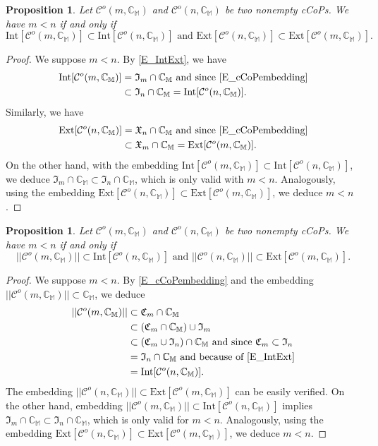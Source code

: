\documentclass[12pt]{amsart}
\newtheorem{proposition}[theorem]{Proposition}
\theoremstyle{definition}
\theoremstyle{remark}
\numberwithin{equation}{section}
\newcommand{\C}{\mathcal{C}}
\newcommand{\CC}{\mathbb{C}}
\newcommand{\CV}{\mathfrak{C}}
\newcommand{\M}{\mathbb{M}}
\newcommand{\I}{\mathfrak{I}}
\newcommand{\E}{\mathfrak{X}}
\newcommand{\In}[1]{\mathrm{Int}[#1]}
\newcommand{\Ex}[1]{\mathrm{Ext}[#1]}
\begin{document}
\begin{proposition}\label{P_IntExt}
Let $\C^o(m,\CC_{\M})$ and $\C^o(n,\CC_{\M})$ be two nonempty cCoPs. We have $m<n$ if and only if
\[
\In{\C^o(m,\CC_{\M})}\subset\In{\C^o(n,\CC_{\M})}\mbox{ and }
\Ex{\C^o(n,\CC_{\M})}\subset\Ex{\C^o(m,\CC_{\M})}.
\]
\end{proposition}

\begin{proof}
We suppose $m<n$. By \eqref{E_IntExt}, we have
\begin{align*}
\In{\C^o(m,\CC_{\M})}&=\I_m\cap\CC_{\M}\mbox{ and since \eqref{E_cCoPembedding}}\\
&\subset\I_n\cap\CC_{\M}
=\In{\C^o(n,\CC_{\M})}.
\end{align*}
Similarly, we have
\begin{align*}
\Ex{\C^o(n,\CC_{\M})}&=\E_n\cap\CC_{\M}\mbox{ and since \eqref{E_cCoPembedding}}\\
&\subset\E_m\cap\CC_{\M}
=\Ex{\C^o(m,\CC_{\M})}.
\end{align*}
On the other hand, with the embedding $\In{\C^o(m,\CC_{\M})}\subset\In{\C^o(n,\CC_{\M})}$, we deduce $\I_m\cap\CC_{\M}\subset\I_n\cap\CC_{\M}$, which is only valid with $m<n$. Analogously, using the embedding $\Ex{\C^o(n,\CC_{\M})}\subset\Ex{\C^o(m,\CC_{\M})}$, we deduce $m<n$.
\end{proof}
\bigskip

\begin{proposition}
Let $\C^o(m,\CC_{\M})$ and $\C^o(n,\CC_{\M})$ be two nonempty cCoPs. We have $m<n$ if and only if
\[
||\C^o(m,\CC_{\M})||\subset\In{\C^o(n,\CC_{\M})}\mbox{ and }
||\C^o(n,\CC_{\M})||\subset\Ex{\C^o(m,\CC_{\M})}.
\]
\end{proposition}

\begin{proof}
We suppose $m<n$. By \eqref{E_cCoPembedding} and the embedding $||\C^o(m,\CC_{\M})||\subset\CC_{\M}$, we deduce
\begin{align*}
||\C^o(m,\CC_{\M})||&\subset\CV_m\cap\CC_{\M}\\
&\subset(\CV_m\cap\CC_{\M})\cup\I_m\\
&\subset(\CV_m\cup\I_n)\cap\CC_{\M}\mbox{ and since }\CV_m\subset\I_n\\
&=\I_n\cap\CC_{\M}\mbox{ and because of \eqref{E_IntExt}}\\
&=\In{\C^o(n,\CC_{\M})}.
\end{align*}
The embedding $||\C^o(n,\CC_{\M})||\subset\Ex{\C^o(m,\CC_{\M})}$ can be easily verified. On the other hand, embedding $||\C^o(m,\CC_{\M})||\subset\In{\C^o(n,\CC_{\M})}$ implies $\I_m\cap\CC_{\M}\subset\I_n\cap\CC_{\M}$, which is only valid for $m<n$. Analogously, using the embedding $\Ex{\C^o(n,\CC_{\M})}\subset\Ex{\C^o(m,\CC_{\M})}$, we deduce $m<n$.
\end{proof}
\bigskip
\end{document}
